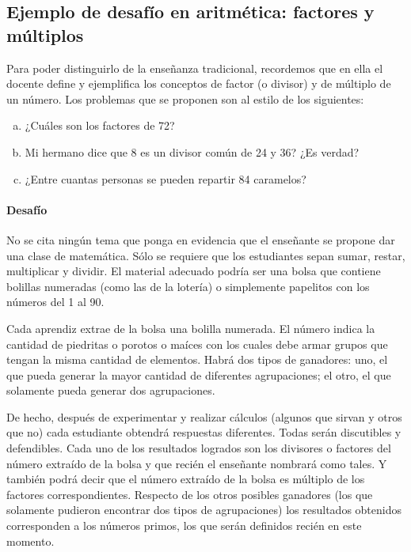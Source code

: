 \documentclass[oneside,spanish]{amsart}
\numberwithin{equation}{section}
\numberwithin{figure}{section}
\theoremstyle{definition}
\begin{document}
\subsection{Ejemplo de desafío en aritmética: factores y múltiplos}

Para poder distinguirlo de la enseñanza tradicional, recordemos que en ella el docente define y ejemplifica los conceptos de factor (o divisor) y de múltiplo de un número. Los problemas que se proponen son al estilo de los siguientes:
\begin{enumerate}[a)]
	\item ¿Cuáles son los factores de 72?
	\item Mi hermano dice que 8 es un divisor común de 24 y 36? ¿Es verdad?
	\item ¿Entre cuantas personas se pueden repartir 84 caramelos?
\end{enumerate}

\paragraph{\bfseries Desafío}

No se cita ningún tema que ponga en evidencia que el enseñante se propone dar una clase de matemática. Sólo se requiere que los estudiantes sepan sumar, restar, multiplicar y dividir. El material adecuado podría ser una bolsa que contiene bolillas numeradas (como las de la lotería) o simplemente papelitos con los números del 1 al 90.

Cada aprendiz extrae de la bolsa una bolilla numerada. El número indica la cantidad de piedritas o porotos o maíces con los cuales debe armar grupos que tengan la misma cantidad de elementos. Habrá dos tipos de ganadores: uno, el que pueda generar la mayor cantidad de diferentes agrupaciones; el otro, el que solamente pueda generar dos agrupaciones. 

De hecho, después de experimentar y realizar cálculos (algunos que sirvan y otros que no) cada estudiante obtendrá respuestas diferentes. Todas serán discutibles y defendibles. Cada uno de los resultados logrados son los divisores o factores del número extraído de la bolsa y que recién el enseñante nombrará como tales. Y también podrá decir que el número extraído de la bolsa es múltiplo de los factores correspondientes. Respecto de los otros posibles ganadores (los que solamente pudieron encontrar dos tipos de agrupaciones) los resultados obtenidos corresponden a los números primos, los que serán definidos recién en este momento.
\end{document}
